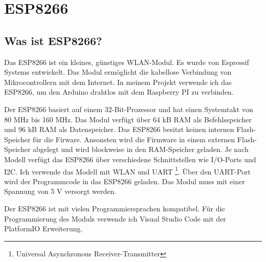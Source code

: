 \documentclass[12pt, letterpaper]{article}
\begin{document}
\section{ESP8266}
\subsection[Überblick]{Was ist ESP8266?}
\par Das ESP8266 ist ein kleines, günstiges WLAN-Modul. Es wurde von Espressif Systems entwickelt. Das Modul ermöglicht die kabellose Verbindung von Mikrocontrollern mit dem Internet. In meinem Projekt verwende ich das ESP8266, um den Arduino drahtlos mit dem Raspberry PI zu verbinden.
\par Der ESP8266 basiert auf einem 32-Bit-Prozessor und hat einen Systemtakt von 80 MHz bis 160 MHz. Das Modul verfügt über 64 kB RAM als Befehlsspeicher und 96 kB RAM als Datenspeicher. Das ESP8266 besitzt keinen internen Flash-Speicher für die Firware. Ansonsten wird die Firmware in einem externen Flash-Speicher abgelegt und wird blockweise in den RAM-Speicher geladen. Je nach Modell verfügt das ESP8266 über verschiedene Schnittstellen wie I/O-Ports und I2C. Ich verwende das Modell mit WLAN und UART \footnote[1]{Universal Asynchronous Receiver-Transmitter}. Über den UART-Port wird der Programmcode in das ESP8266 geladen. Das Modul muss mit einer Spannung von 5 V versorgt werden.
\par Der ESP8266 ist mit vielen Programmiersprachen kompatibel. Für die Programmierung des Moduls verwende ich Visual Studio Code mit der PlatformIO Erweiterung. 
\end{document}
